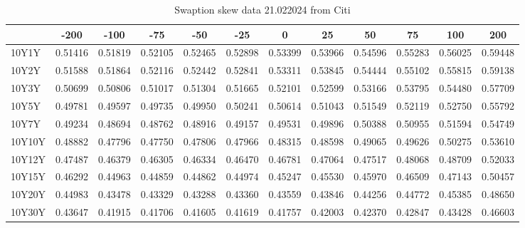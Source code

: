\begin{table}[h]
    \centering
    \begin{tabular}{l|*{11}{c}}
        & -200 & -100 & -75 & -50 & -25 & 0 & 25 & 50 & 75 & 100 & 200 \\
    \hline
    10Y1Y & 0.51416 & 0.51819 & 0.52105 & 0.52465 & 0.52898 & 0.53399 & 0.53966 & 0.54596 & 0.55283 & 0.56025 & 0.59448 \\
    10Y2Y & 0.51588 & 0.51864 & 0.52116 & 0.52442 & 0.52841 & 0.53311 & 0.53845 & 0.54444 & 0.55102 & 0.55815 & 0.59138 \\
    10Y3Y & 0.50699 & 0.50806 & 0.51017 & 0.51304 & 0.51665 & 0.52101 & 0.52599 & 0.53166 & 0.53795 & 0.54480 & 0.57709 \\
    10Y5Y & 0.49781 & 0.49597 & 0.49735 & 0.49950 & 0.50241 & 0.50614 & 0.51043 & 0.51549 & 0.52119 & 0.52750 & 0.55792 \\
    10Y7Y & 0.49234 & 0.48694 & 0.48762 & 0.48916 & 0.49157 & 0.49531 & 0.49896 & 0.50388 & 0.50955 & 0.51594 & 0.54749 \\
    10Y10Y & 0.48882 & 0.47796 & 0.47750 & 0.47806 & 0.47966 & 0.48315 & 0.48598 & 0.49065 & 0.49626 & 0.50275 & 0.53610 \\
    10Y12Y & 0.47487 & 0.46379 & 0.46305 & 0.46334 & 0.46470 & 0.46781 & 0.47064 & 0.47517 & 0.48068 & 0.48709 & 0.52033 \\
    10Y15Y & 0.46292 & 0.44963 & 0.44859 & 0.44862 & 0.44974 & 0.45247 & 0.45530 & 0.45970 & 0.46509 & 0.47143 & 0.50457 \\
    10Y20Y & 0.44983 & 0.43478 & 0.43329 & 0.43288 & 0.43360 & 0.43559 & 0.43846 & 0.44256 & 0.44772 & 0.45385 & 0.48650 \\
    10Y30Y & 0.43647 & 0.41915 & 0.41706 & 0.41605 & 0.41619 & 0.41757 & 0.42003 & 0.42370 & 0.42847 & 0.43428 & 0.46603 \\
    \end{tabular}
    \caption{Swaption skew data 21.022024 from Citi}
    \label{tab:swaption_skew_data_2024}
    \end{table}
    